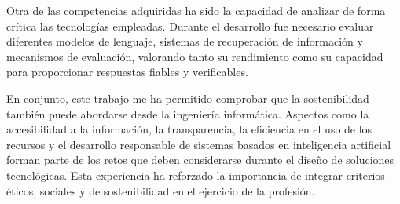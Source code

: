 Otra de las competencias adquiridas ha sido la capacidad de analizar de forma crítica las tecnologías empleadas. Durante el desarrollo fue necesario evaluar diferentes modelos de lenguaje, sistemas de recuperación de información y mecanismos de evaluación, valorando tanto su rendimiento como su capacidad para proporcionar respuestas fiables y verificables.

En conjunto, este trabajo me ha permitido comprobar que la sostenibilidad también puede abordarse desde la ingeniería informática. Aspectos como la accesibilidad a la información, la transparencia, la eficiencia en el uso de los recursos y el desarrollo responsable de sistemas basados en inteligencia artificial forman parte de los retos que deben considerarse durante el diseño de soluciones tecnológicas. Esta experiencia ha reforzado la importancia de integrar criterios éticos, sociales y de sostenibilidad en el ejercicio de la profesión.